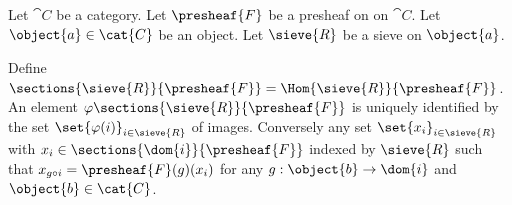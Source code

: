 \begin{definition}
Let $\cat{C}$ be a category.
Let $\presheaf{F}$ be a presheaf on on $\cat{C}$.
Let $\object{a} \in \cat{C}$ be an object.
Let $\sieve{R}$ be a sieve on $\object{a}$.

Define $\sections{\sieve{R}}{\presheaf{F}} = \Hom{\sieve{R}}{\presheaf{F}}$.
An element $\varphi \sections{\sieve{R}}{\presheaf{F}}$ is uniquely identified 
by the set $\set{\varphi(i)}_{i\in\sieve{R}}$ of images. 
Conversely any set $\set{x_i}_{i \in \sieve{R}}$ 
with $x_i \in \sections{\dom{i}}{\presheaf{F}}$ indexed by $\sieve{R}$
such that $x_{g \circ i} = \presheaf{F}(g)(x_i)$ 
for any $g:\object{b} \rightarrow \dom{i}$ and $\object{b} \in \cat{C}$.
\end{definition}